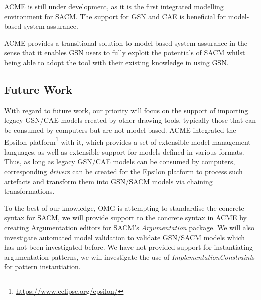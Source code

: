 ACME is still under development, as it is the first integrated modelling environment for SACM. The support for GSN and CAE is beneficial for model-based system assurance. 

ACME provides a transitional solution to model-based system assurance in the sense that it enables GSN users to fully exploit the potentials of SACM whilst being able to adopt the tool with their existing knowledge in using GSN. 

\subsection{Future Work}
With regard to future work, our priority will focus on the support of importing legacy GSN/CAE models created by other drawing tools, typically those that can be consumed by computers but are not model-based. 
ACME integrated the Epsilon platform\footnote{\url{https://www.eclipse.org/epsilon/}} with it, which provides a set of extensible model management languages, as well as extensible support for models defined in various formats.
Thus, as long as legacy GSN/CAE models can be consumed by computers, corresponding \textit{driver}s can be created for the Epsilon platform to process such artefacts and transform them into GSN/SACM models via chaining transformations.

To the best of our knowledge, OMG is attempting to standardise the concrete syntax for SACM, we will provide support to the concrete syntax in ACME by creating Argumentation editors for SACM's \textit{Argumentation} package. 
We will also investigate automated model validation to validate GSN/SACM models which has not been investigated before. We have not provided support for instantiating argumentation patterns, we will investigate the use of \textit{ImplementationConstraint}s for pattern instantiation.